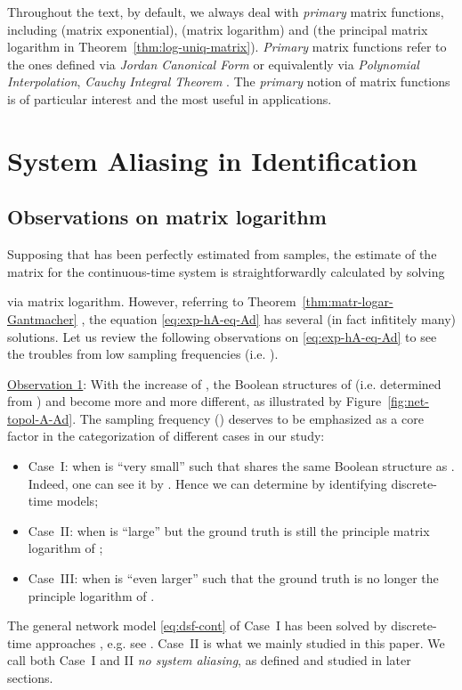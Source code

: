 \documentclass[letterpaper,10pt,journal,final]{IEEEtran}
\theoremstyle{definition}
\theoremstyle{remark}
\begin{document}
Throughout the text, by default, we always deal with \emph{primary} matrix functions,
including  (matrix exponential),  (matrix logarithm) and  (the
principal matrix logarithm in Theorem~\ref{thm:log-uniq-matrix}). \emph{Primary}
matrix functions refer to the ones defined via \emph{Jordan Canonical Form} or
equivalently via \emph{Polynomial Interpolation}, \emph{Cauchy Integral Theorem}
\cite[chap.~1]{Higham2008}. The \emph{primary} notion of matrix functions is of
particular interest and the most useful in applications\cite{Higham2008,Horn2003}.



\section{System Aliasing in Identification}
\label{sec:syst-alias-sysid}

\subsection{Observations on matrix logarithm}
\label{subsec:ambig-matrix-log}

Supposing that  has been perfectly estimated from samples, the estimate of the
 matrix for the continuous-time system is straightforwardly calculated by solving

via matrix logarithm.  However, referring to Theorem~\ref{thm:matr-logar-Gantmacher}
\cite{Higham2008}, the equation \eqref{eq:exp-hA-eq-Ad} has several (in fact infititely many)
solutions. Let us review the following observations on \eqref{eq:exp-hA-eq-Ad} to see
the troubles from low sampling frequencies (i.e. ).


\smallskip
\noindent\underline{Observation 1}: With the increase of , the Boolean structures of
 (i.e.  determined from ) and  become more and more different, as illustrated by Figure~\ref{fig:net-topol-A-Ad}.
  The sampling frequency () deserves to be emphasized as a core factor in the
  categorization of different cases in our study:
  \begin{itemize}
  \item {Case~I}: when  is ``very small'' such that  shares the same Boolean
    structure as . Indeed, one can see it by
    . Hence we can determine
     by identifying discrete-time models;
  \item {Case~II}: when  is ``large'' but the ground truth  is
    still the principle matrix logarithm of ;
  \item {Case~III}: when  is ``even larger'' such that the ground truth  is no
    longer the principle logarithm of .
  \end{itemize}
The general network model \eqref{eq:dsf-cont} of {Case~I} has been solved by
  discrete-time approaches , e.g. see \cite{Yue2017a,Chiuso2012}.  {Case~II}
  is what we mainly studied in this paper. We call both {Case~I} and
  {II} \emph{no system aliasing}, as defined and studied in later sections.
\end{document}
